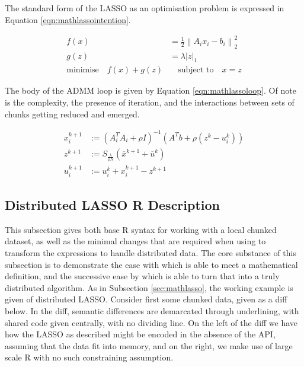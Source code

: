 The standard form of the LASSO as an optimisation problem is expressed in Equation \cref{eqn:mathlassointention}.

\begin{equation}\label{eqn:mathlassointention}
    \begin{aligned}
        f(x) &= \frac{1}{2} \left\| A_i x_i - b_i \right\|^2_2 \\
        g(z) &= \lambda \left| z \right|_1 \\
        \text{minimise} \quad f(x) + g(z) &\quad \text{subject to} \quad x = z
    \end{aligned} 
\end{equation}

The body of the ADMM loop is given by Equation \cref{eqn:mathlassoloop}.
Of note is the complexity, the presence of iteration, and the interactions between sets of chunks getting reduced and emerged.

\begin{equation}\label{eqn:mathlassoloop}
    \begin{aligned}
        x_i^{k+1} &:= (A_i^T A_i + \rho I)^{-1}(A^T b + \rho(z^k - u_i^k))\\
        z^{k+1} &:= S_\frac{\lambda}{\rho N} (\overline{x}^{k+1} + \overline{u}^k) \\
        u_i^{k+1} &:= u_i^k + x_i^{k+1} - z^{k+1}
    \end{aligned} 
\end{equation}

\subsection{Distributed LASSO R Description}\label{sec:rlasso}

This subsection gives both base R syntax for working with a local chunked dataset, as well as the minimal changes that are required when using  to transform the expressions to handle distributed data.
The core substance of this subsection is to demonstrate the ease with which  is able to meet a mathematical definition, and the successive ease by which  is able to turn that into a truly distributed algorithm.
As in Subsection \cref{sec:mathlasso}, the working example is given of distributed LASSO.
Consider first some chunked data, given as a diff below.
In the diff, semantic differences are demarcated through underlining, with shared code given centrally, with no dividing line.
On the left of the diff we have how the LASSO as described might be encoded in the absence of the API, assuming that the data fit into memory, and on the right, we make use of large scale R with no such constraining assumption.

